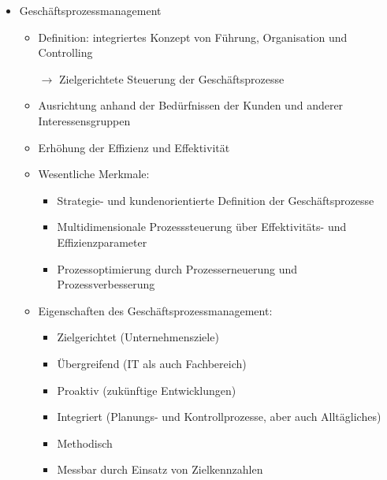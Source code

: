 \documentclass[11pt,a4paper]{article}
\begin{document}
\begin{itemize}
\item Geschäftsprozessmanagement
	\begin{itemize}
	\item Definition: integriertes Konzept von Führung, Organisation und Controlling
	\item[$\rightarrow$] Zielgerichtete Steuerung der Geschäftsprozesse
	\item Ausrichtung anhand der Bedürfnissen der Kunden und anderer Interessensgruppen
	\item Erhöhung der Effizienz und Effektivität
	\item Wesentliche Merkmale:
		\begin{itemize}
		\item Strategie- und kundenorientierte Definition der Geschäftsprozesse
		\item Multidimensionale Prozesssteuerung über Effektivitäts- und Effizienzparameter
		\item Prozessoptimierung durch Prozesserneuerung und Prozessverbesserung
		\end{itemize}
	\item Eigenschaften des Geschäftsprozessmanagement:
		\begin{itemize}
		\item Zielgerichtet (Unternehmensziele)
		\item Übergreifend (IT als auch Fachbereich)
		\item Proaktiv (zukünftige Entwicklungen)
		\item Integriert (Planungs- und Kontrollprozesse, aber auch Alltägliches)
		\item Methodisch
		\item Messbar durch Einsatz von Zielkennzahlen
		\end{itemize}			
	\end{itemize}
	
	
\end{itemize}
\end{document}
